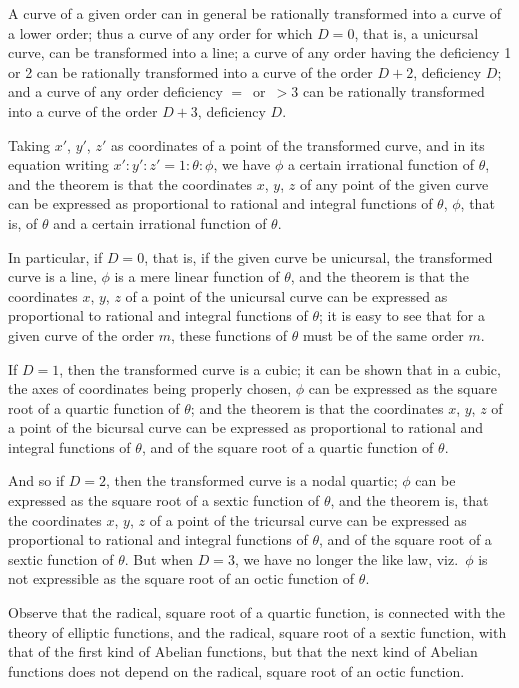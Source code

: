 \documentclass[12pt,a4paper,oneside]{book}
\begin{document}
A curve of a given order can in general be rationally transformed into a curve of a lower order; thus a curve of any order for which $D=0$, that is, a unicursal curve, can be transformed into a line; a curve of any order having the deficiency 1 or 2 can be rationally transformed into a curve of the order $D+2$, deficiency $D$; and a curve of any order deficiency $=$~or~$>3$ can be rationally transformed into a curve of the order $D+3$, deficiency $D$.

Taking $x'$, $y'$, $z'$ as coordinates of a point of the transformed curve, and in its equation writing $x':y':z'=1:\theta:\phi$, we have $\phi$ a certain irrational function of $\theta$, and the theorem is that the coordinates $x$, $y$, $z$ of any point of the given curve can be expressed as proportional to rational and integral functions of $\theta$, $\phi$, that is, of $\theta$ and a certain irrational function of $\theta$.

In particular, if $D=0$, that is, if the given curve be unicursal, the transformed curve is a line, $\phi$ is a mere linear function of $\theta$, and the theorem is that the coordinates $x$, $y$, $z$ of a point of the unicursal curve can be expressed as proportional to rational and integral functions of $\theta$; it is easy to see that for a given curve of the order $m$, these functions of $\theta$ must be of the same order $m$.

If $D=1$, then the transformed curve is a cubic; it can be shown that in a cubic, the axes of coordinates being properly chosen, $\phi$ can be expressed as the square root of a quartic function of $\theta$; and the theorem is that the coordinates $x$, $y$, $z$ of a point of the bicursal curve can be expressed as proportional to rational and integral functions of $\theta$, and of the square root of a quartic function of $\theta$.

And so if $D=2$, then the transformed curve is a nodal quartic; $\phi$ can be expressed as the square root of a sextic function of $\theta$, and the theorem is, that the coordinates $x$, $y$, $z$ of a point of the tricursal curve can be expressed as proportional to rational and integral functions of $\theta$, and of the square root of a sextic function of $\theta$. But when $D=3$, we have no longer the like law, viz.\ $\phi$ is not expressible as the square root of an octic function of $\theta$.

Observe that the radical, square root of a quartic function, is connected with the theory of elliptic functions, and the radical, square root of a sextic function, with that of the first kind of Abelian functions, but that the next kind of Abelian functions does not depend on the radical, square root of an octic function.
\end{document}
